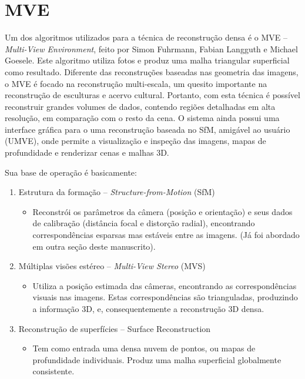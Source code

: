\section{MVE}\label{sec:mve}
%
Um dos algoritmos utilizados para a técnica de reconstrução densa é o MVE -- {\it Multi-View  Environment}, feito por Simon Fuhrmann, Fabian Langguth e Michael Goesele. Este algoritmo utiliza fotos e produz uma malha triangular superficial como resultado. Diferente das reconstruções baseadas nas geometria das imagens, o MVE é focado na reconstrução multi-escala, um quesito importante na reconstrução de esculturas e acervo cultural. Portanto, com esta técnica é possível reconstruir grandes volumes de dados, contendo regiões detalhadas em alta resolução, em comparação com o resto da cena. O sistema ainda possui uma interface gráfica para o uma reconstrução baseada no SfM, amigável ao usuário (UMVE), onde permite a visualização e inspeção das imagens, mapas de profundidade e renderizar cenas e malhas 3D.

Sua base de operação é basicamente:

\begin{enumerate}
\item{Estrutura da formação -- {\it Structure-from-Motion} (SfM)}

\begin{itemize}
\item{
Reconstrói os parâmetros da câmera (posição e orientação) e seus dados de calibração (distância focal e distorção radial),
encontrando correspondências esparsas mas estáveis entre as imagens. (Já foi abordado em outra seção deste manuscrito).
}
\end{itemize}

\item{Múltiplas visões estéreo -- {\it Multi-View Stereo} (MVS)}
\begin{itemize}
\item{
Utiliza a posição estimada das câmeras, encontrando as correspondências visuais nas imagens. Estas correspondências são trianguladas, produzindo a informação 3D, e,
consequentemente a reconstrução 3D densa.
} 
\end{itemize}
\item{Reconstrução de superfícies -- {Surface Reconstruction}}
\begin{itemize}
\item{
Tem como entrada uma densa nuvem de pontos, ou mapas de profundidade individuais. Produz uma malha superficial globalmente consistente.
}
\end{itemize}
\end{enumerate}

